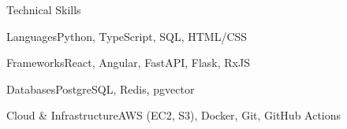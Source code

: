 \documentclass[
	11pt
]{../../../template}
\begin{document}
	\begin{rSection}{T}{echnical Skills}
		\begin{rSet}{Languages}{Python, TypeScript, SQL, HTML/CSS}
		\end{rSet}
		\begin{rSet}{Frameworks}{React, Angular, FastAPI, Flask, RxJS}
		\end{rSet}
		\begin{rSet}{Databases}{PostgreSQL, Redis, pgvector}
		\end{rSet}
		\begin{rSet}{Cloud \& Infrastructure}{AWS (EC2, S3), Docker, Git, GitHub Actions}
		\end{rSet}
	\end{rSection}
\end{document}

